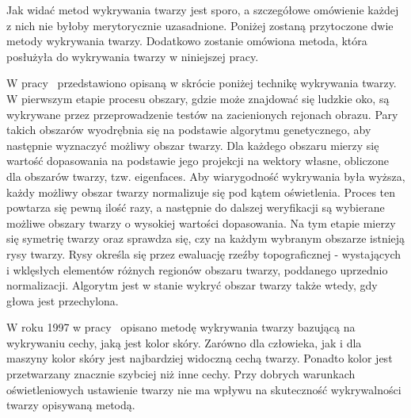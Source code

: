 \documentclass[a4paper,twoside,12pt]{book}
\begin{document}


    Jak widać metod wykrywania twarzy jest sporo,
    a szczegółowe omówienie każdej z nich nie byłoby merytorycznie uzasadnione.
    Poniżej zostaną przytoczone dwie metody wykrywania twarzy.
    Dodatkowo zostanie omówiona metoda, która posłużyła do wykrywania twarzy w niniejszej pracy.

    W pracy~\cite{wongLamSiu}
    przedstawiono opisaną w skrócie poniżej technikę wykrywania twarzy.
    W pierwszym etapie procesu obszary, gdzie może znajdować się ludzkie oko,
    są wykrywane przez przeprowadzenie testów na zacienionych rejonach obrazu.
    Pary takich obszarów wyodrębnia się na podstawie algorytmu genetycznego,
    aby następnie wyznaczyć możliwy obszar twarzy.
    Dla każdego obszaru mierzy się wartość dopasowania na podstawie jego projekcji na wektory własne, obliczone dla
    obszarów twarzy, tzw. eigenfaces.
    Aby wiarygodność wykrywania była wyższa,
    każdy możliwy obszar twarzy normalizuje się pod kątem oświetlenia.
    Proces ten powtarza się pewną ilość razy,
    a następnie do dalszej weryfikacji są wybierane możliwe obszary twarzy o wysokiej wartości dopasowania.
    Na tym etapie mierzy się symetrię twarzy oraz sprawdza się,
    czy na każdym wybranym obszarze istnieją rysy twarzy.
    Rysy określa się przez ewaluację rzeźby topograficznej - wystających i wklęsłych elementów
    różnych regionów obszaru twarzy, poddanego uprzednio normalizacji.
    Algorytm jest w stanie wykryć obszar twarzy także wtedy, gdy głowa jest przechylona.

    W roku 1997 w pracy~\cite{clowleyCoutaz} opisano metodę wykrywania twarzy bazującą na
    wykrywaniu cechy, jaką jest kolor skóry.
    Zarówno dla człowieka, jak i dla maszyny kolor skóry jest
    najbardziej widoczną cechą twarzy.
    Ponadto kolor jest przetwarzany znacznie szybciej niż inne cechy.
    Przy dobrych warunkach oświetleniowych ustawienie twarzy nie ma wpływu na skuteczność wykrywalności twarzy
    opisywaną metodą.
\end{document}
